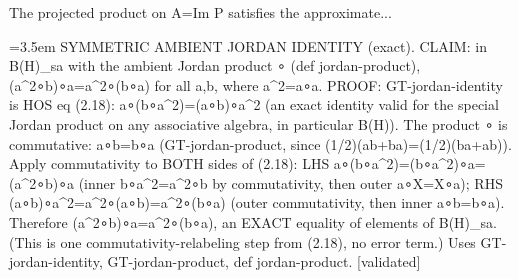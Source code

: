 \documentclass{article}
\newcommand{\step}[1]{\par\noindent\hangindent=3.5em\hangafter=1%
  \makebox[3.5em][l]{\textbf{#1.}}}
\newcommand{\steptag}[1]{\hfill{\small\textsf{[#1]}}}
\begin{document}
\begin{proofbox}{The projected product on A=Im P satisfies the approximate...}
\step{1.3.1} SYMMETRIC AMBIENT JORDAN IDENTITY (exact). CLAIM: in B(H)\_sa with the ambient Jordan product ∘ (def jordan-product), (a\textasciicircum{}2∘b)∘a=a\textasciicircum{}2∘(b∘a) for all a,b, where a\textasciicircum{}2=a∘a. PROOF: GT-jordan-identity is HOS eq (2.18): a∘(b∘a\textasciicircum{}2)=(a∘b)∘a\textasciicircum{}2 (an exact identity valid for the special Jordan product on any associative algebra, in particular B(H)). The product ∘ is commutative: a∘b=b∘a (GT-jordan-product, since (1/2)(ab+ba)=(1/2)(ba+ab)). Apply commutativity to BOTH sides of (2.18): LHS a∘(b∘a\textasciicircum{}2)=(b∘a\textasciicircum{}2)∘a=(a\textasciicircum{}2∘b)∘a (inner b∘a\textasciicircum{}2=a\textasciicircum{}2∘b by commutativity, then outer a∘X=X∘a); RHS (a∘b)∘a\textasciicircum{}2=a\textasciicircum{}2∘(a∘b)=a\textasciicircum{}2∘(b∘a) (outer commutativity, then inner a∘b=b∘a). Therefore (a\textasciicircum{}2∘b)∘a=a\textasciicircum{}2∘(b∘a), an EXACT equality of elements of B(H)\_sa. (This is one commutativity-relabeling step from (2.18), no error term.) Uses GT-jordan-identity, GT-jordan-product, def jordan-product. \steptag{validated} \\[4pt]
\end{proofbox}
\end{document}
